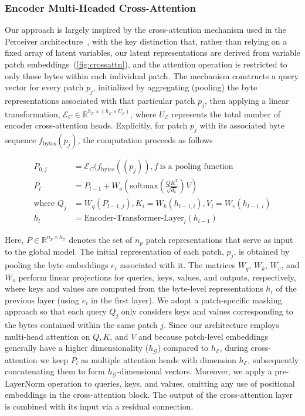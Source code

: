 \subsubsection{Encoder Multi-Headed Cross-Attention}
\label{sec:enc-cross-attn}
Our approach is largely inspired by the cross-attention mechanism used in the Perceiver architecture~\citep{jaegle2021perceiver}, with the key distinction that, rather than relying on a fixed array of latent variables, our latent representations are derived from variable patch embeddings~(\autoref{fig:crossattn}), and the attention operation is restricted to only those bytes within each individual patch. The mechanism constructs a query vector for every patch $p_j$, initialized by aggregating (pooling) the byte representations associated with that particular patch $p_j$, then applying a linear transformation, $\mathcal{E}_{C} \in \mathbb{R}^{h_{\mathcal{E}} \times (h_{\mathcal{E}} \times U_{\mathcal{E}})}$, where $U_{\mathcal{E}}$ represents the total number of encoder cross-attention heads. Explicitly, for patch $p_j$ with its associated byte sequence $f_{\text{bytes}}(p_j)$, the computation proceeds as follows

\begin{align}
P_{0,j} &= \mathcal{E}_{C}(f_\text{bytes}((p_j)), f~ \text{is a pooling function} \\
P_l &= P_{l-1} + W_o\left(\text{softmax}\left(\frac{QK^T}{\sqrt{d_k}}\right)V\right) \\
\text{where } Q_j &= W_q(P_{l-1,j}), K_i = W_k(h_{l-1,i}), V_i = W_v(h_{l-1,i}) \\
h_l &= \text{Encoder-Transformer-Layer}_l(h_{l-1})
\end{align}

Here, $P \in \mathbb{R}^{n_p \times h_{\mathcal{G}}}$ denotes the set of $n_p$ patch representations that serve as input to the global model. The initial representation of each patch, $p_j$, is obtained by pooling the byte embeddings $e_i$ associated with it. The matrices $W_q$, $W_k$, $W_v$, and $W_o$ perform linear projections for queries, keys, values, and outputs, respectively, where keys and values are computed from the byte-level representations $h_i$ of the previous layer (using $e_i$ in the first layer). We adopt a patch-specific masking approach so that each query $Q_j$ only considers keys and values corresponding to the bytes contained within the same patch $j$. Since our architecture employs multi-head attention on $Q, K$, and $V$ and because patch-level embeddings generally have a higher dimensionality ($h_{\mathcal{G}}$) compared to $h_{\mathcal{E}}$, during cross-attention we keep $P_l$ as multiple attention heads with dimension $h_{\mathcal{E}}$, subsequently concatenating them to form $h_{\mathcal{G}}$-dimensional vectors. Moreover, we apply a pre-LayerNorm operation to queries, keys, and values, omitting any use of positional embeddings in the cross-attention block. The output of the cross-attention layer is combined with its input via a residual connection.

